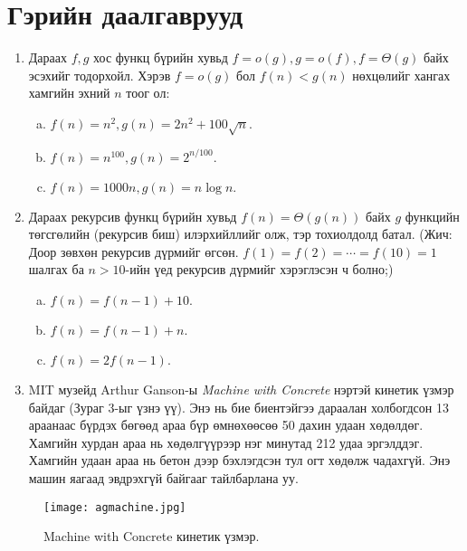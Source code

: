 \documentclass{article}
\begin{document}
\section*{Гэрийн даалгаврууд}
\begin{enumerate}
  \item Дараах $f, g$ хос функц бүрийн хувьд $f = o(g), g=o(f), f =\Theta(g)$ байх эсэхийг тодорхойл. Хэрэв $f=o(g)$ бол $f(n)<g(n)$ нөхцөлийг хангах хамгийн эхний $n$ тоог ол:
        \begin{enumerate}[a)]
            \item $f(n) = n^2, g(n) = 2n^2 + 100\sqrt{n}.$
            \item $f(n) = n^{100}, g(n) = 2^{n/100}.$
            \item $f(n) = 1000n, g(n) = n \log n.$
        \end{enumerate}
  \item Дараах рекурсив функц бүрийн хувьд $f (n) = \Theta(g (n))$ байх $g$ функцийн төгсгөлийн (рекурсив биш) илэрхийллийг олж, тэр тохиолдолд батал. (Жич: Доор зөвхөн рекурсив дүрмийг өгсөн. $f (1) = f (2) = \cdots = f (10) = 1$ шалгах ба $n>10$-ийн үед рекурсив дүрмийг хэрэглэсэн ч болно;)
        \begin{enumerate}[a)]
            \item $f(n) = f(n-1) + 10.$
            \item $f(n) = f(n-1) + n.$
            \item $f(n) = 2f(n-1).$
        \end{enumerate}
  \item MIT музейд Arthur Ganson-ы \textit{Machine with Concrete} нэртэй кинетик үзмэр байдаг (Зураг 3-ыг үзнэ үү). Энэ нь бие биентэйгээ дараалан холбогдсон 13 араанаас бүрдэх бөгөөд араа бүр өмнөхөөсөө 50 дахин удаан хөдөлдөг. Хамгийн хурдан араа нь хөдөлгүүрээр нэг минутад 212 удаа эргэлддэг. Хамгийн удаан араа нь бетон дээр бэхлэгдсэн тул огт хөдөлж чадахгүй. Энэ машин яагаад эвдрэхгүй байгааг тайлбарлана уу.
\end{enumerate}

\begin{figure}[ht!]
    \centering
    \texttt{[image: agmachine.jpg]}
    \caption{Machine with Concrete кинетик үзмэр.}
\end{figure}
\end{document}

